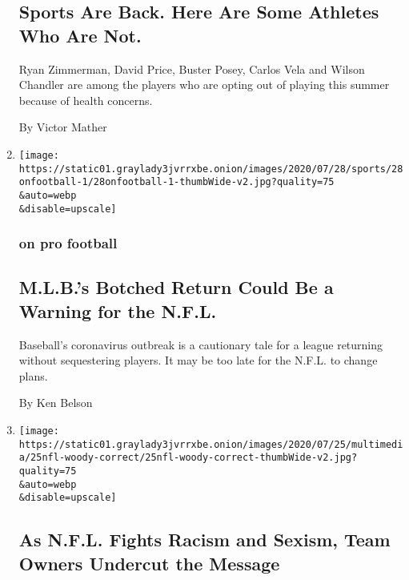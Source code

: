 \begin{enumerate}
{  \subsection{Sports Are Back. Here Are Some Athletes Who Are
  Not.}\label{sports-are-back-here-are-some-athletes-who-are-not}}

  Ryan Zimmerman, David Price, Buster Posey, Carlos Vela and Wilson
  Chandler are among the players who are opting out of playing this
  summer because of health concerns.

  By Victor Mather
\item
  \href{/2020/07/29/sports/football/nfl-mlb-opting-out.html}{}

  \texttt{[image: https://static01.graylady3jvrrxbe.onion/images/2020/07/28/sports/28onfootball-1/28onfootball-1-thumbWide-v2.jpg?quality=75\\\&auto=webp\\\&disable=upscale]}

  \hypertarget{on-pro-football}{%
  \subsubsection{on pro football}\label{on-pro-football}}

  \hypertarget{mlbs-botched-return-could-be-a-warning-for-the-nfl}{%
  \subsection{M.L.B.'s Botched Return Could Be a Warning for the
  N.F.L.}\label{mlbs-botched-return-could-be-a-warning-for-the-nfl}}

  Baseball's coronavirus outbreak is a cautionary tale for a league
  returning without sequestering players. It may be too late for the
  N.F.L. to change plans.

  By Ken Belson
\item
  \href{/2020/07/25/sports/football/woody-johnson-trump-jets.html}{}

  \texttt{[image: https://static01.graylady3jvrrxbe.onion/images/2020/07/25/multimedia/25nfl-woody-correct/25nfl-woody-correct-thumbWide-v2.jpg?quality=75\\\&auto=webp\\\&disable=upscale]}

  \hypertarget{as-nfl-fights-racism-and-sexism-team-owners-undercut-the-message}{%
  \subsection{As N.F.L. Fights Racism and Sexism, Team Owners Undercut
  the
  Message}\label{as-nfl-fights-racism-and-sexism-team-owners-undercut-the-message}}


\end{enumerate}
